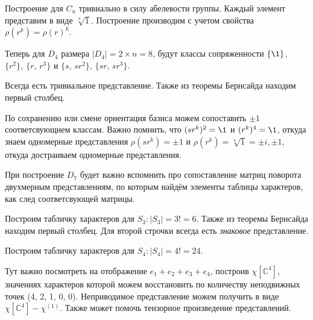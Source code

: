 Построение для $C_n$ тривиально в силу абелевости группы. Каждый элемент представим в виде $\sqrt[n]{1}$. Построение производим с учетом свойства $\rho(r^k) = \rho(r)^k$. 

Теперь для $D_4$ размера $|D_4| = 2 \times n = 8$, будут классы сопряженности $\{\1\}$, $\{r^2\},\ \{r,\, r^3\}$ и $\{s,\, s r^2\}$, $\{s r,\, s r^3\}$. 
\begin{center}

\end{center}
Всегда есть тривиальное представление. Также из теоремы Бернсайда находим первый столбец. 

По сохранению или смене ориентация базиса можем сопоставить $\pm 1$ соответсвующием классам.  Важно помнить, что $(s r^k)^2 = \1$ и $(r^k)^4 = \1$, откуда знаем одномерные представления $\rho(s r^k) = \pm 1$ и $\rho(r^k) = \sqrt[4]{1} = \pm i, \pm 1$, откуда достраиваем одномерные представления. 

При построение $D_7$ будет важно вспомнить про сопоставление матриц поворота двухмерным представлениям, по которым найдём элементы таблицы характеров, как след соответсвующей матрицы. 

Построим табличку характеров для $S_3 \colon  |S_3| = 3! = 6$. Также из теоремы Бернсайда находим первый столбец. Для второй строчки всегда есть \textit{знаковое} представление. 
\begin{center}

\end{center}

Построим табличку характеров для $S_4 \colon  |S_4| = 4! = 24$. 
\begin{center}

\end{center}
Тут важно посмотреть на отображение $e_1 + e_2 + e_3 + e_4$, построив $\chi[\mathbb{C}^4]$, значениях характеров которой можем восстановить по количеству неподвижных точек (4, 2, 1, 0, 0). Неприводимое представление можем получить в виде $\chi[\mathbb{C}^4] - \chi^{(1)}$.
Также может помочь тензорное произведение представлений. 


